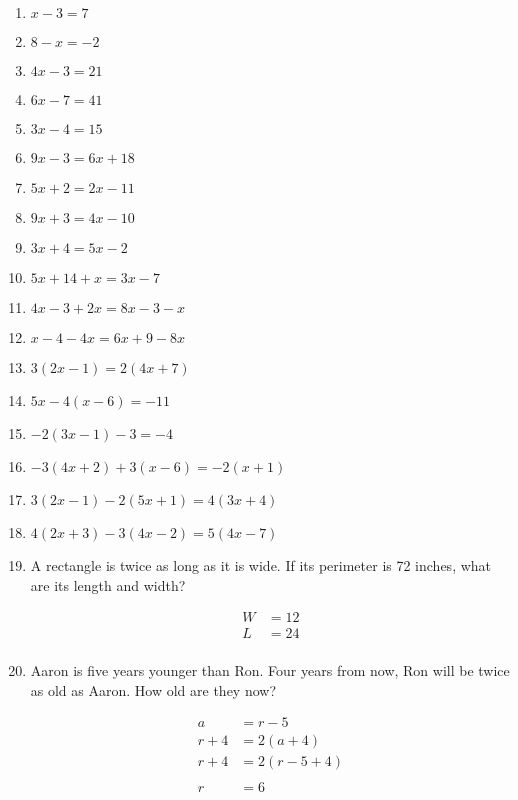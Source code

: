 \documentclass[letterpaper, landscape]{exam}
\begin{document}
    \begin{enumerate}
        \item $x - 3 = 7$
        \item $8 - x = -2$
        \item $4x - 3 = 21$
        \item $6x - 7 = 41$
        \item $3x - 4 = 15$
        \item $9x - 3 = 6x + 18$
        \item $5x + 2 = 2x - 11$
        \item $9x + 3 = 4x - 10$
        \item $3x + 4 = 5x - 2$
        \item $5x + 14 + x = 3x - 7$
        \item $4x - 3 + 2x = 8x - 3 - x$
        \item $x - 4 - 4x = 6x + 9 - 8x$
        \item $3 (2x - 1) = 2 (4x + 7)$
        \item $5x - 4(x - 6) = -11$
        \item $-2 (3x - 1) - 3 = -4$

        \item $-3(4x + 2) + 3(x - 6) = -2(x + 1)$
        \item $3(2x - 1) - 2(5x + 1) = 4 (3x + 4)$
        \item $4(2x + 3) - 3(4x - 2) = 5(4x - 7)$

        \item A rectangle is twice as long as it is wide. If its perimeter is 72 inches, what are
            its length and width? 

            \begin{solution}
                \begin{align*}
                    W &= 12 \\
                    L &= 24 \\
                \end{align*}
            \end{solution}

        \item Aaron is five years younger than Ron. Four years from now, Ron will be twice as old as
            Aaron. How old are they now?

            \begin{solution}
                \begin{align*}
                    a     & = r - 5 \\
                    r + 4 & = 2(a + 4) \\
                    r + 4 & = 2(r - 5 + 4) \\
                    \\
                    r     & = \boxed{ 6 } \\
                \end{align*}
            \end{solution}


    \end{enumerate}
\end{document}
